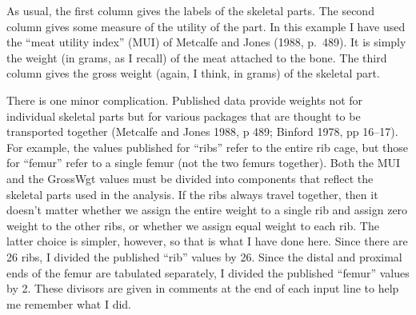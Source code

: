 As usual, the first column gives the labels of the skeletal parts.
The second column gives some measure of the utility of the part.  In
this example I have used the ``meat utility index'' (MUI) of Metcalfe
and Jones (1988, p.~489).  It is simply the weight (in grams, as I
recall) of the meat attached to the bone.  The third column gives the
gross weight (again, I think, in grams) of the skeletal part.

There is one minor complication.  Published data provide weights not
for individual skeletal parts but for various packages that are
thought to be transported together (Metcalfe and Jones 1988, p 489;
Binford 1978, pp 16--17).  For example, the values published for ``ribs''
refer to the entire rib cage, but those for ``femur'' refer to a single
femur (not the two femurs together).  Both the MUI and the GrossWgt
values must be divided into components that reflect the skeletal parts
used in the analysis.  If the ribs always travel together, then it
doesn't matter whether we assign the entire weight to a single rib and
assign zero weight to the other ribs, or whether we assign equal
weight to each rib.  The latter choice is simpler, however, so that is
what I have done here.  Since there are 26 ribs, I divided the
published ``rib'' values by 26.  Since the distal and proximal ends of
the femur are tabulated separately, I divided the published ``femur''
values by 2.  These divisors are given in comments at the end of each
input line to help me remember what I did.

